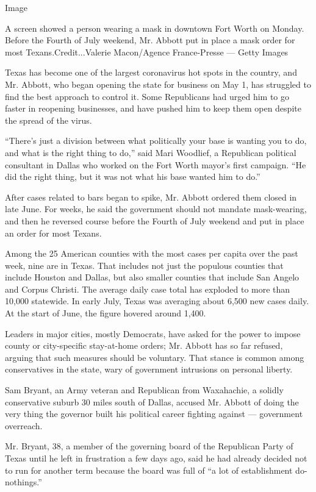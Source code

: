 Image

A screen showed a person wearing a mask in downtown Fort Worth on
Monday. Before the Fourth of July weekend, Mr. Abbott put in place a
mask order for most Texans.Credit...Valerie Macon/Agence France-Presse
--- Getty Images

Texas has become one of the largest coronavirus hot spots in the
country, and Mr. Abbott, who began opening the state for business on May
1, has struggled to find the best approach to control it. Some
Republicans had urged him to go faster in reopening businesses, and have
pushed him to keep them open despite the spread of the virus.

``There's just a division between what politically your base is wanting
you to do, and what is the right thing to do,'' said Mari Woodlief, a
Republican political consultant in Dallas who worked on the Fort Worth
mayor's first campaign. ``He did the right thing, but it was not what
his base wanted him to do.''

After cases related to bars began to spike, Mr. Abbott ordered them
closed in late June. For weeks, he said the government should not
mandate mask-wearing, and then he reversed course before the Fourth of
July weekend and put in place an order for most Texans.

Among the 25 American counties with the most cases per capita over the
past week, nine are in Texas. That includes not just the populous
counties that include Houston and Dallas, but also smaller counties that
include San Angelo and Corpus Christi. The average daily case total has
exploded to more than 10,000 statewide. In early July, Texas was
averaging about 6,500 new cases daily. At the start of June, the figure
hovered around 1,400.

Leaders in major cities, mostly Democrats, have asked for the power to
impose county or city-specific stay-at-home orders; Mr. Abbott has so
far refused, arguing that such measures should be voluntary. That stance
is common among conservatives in the state, wary of government
intrusions on personal liberty.

Sam Bryant, an Army veteran and Republican from Waxahachie, a solidly
conservative suburb 30 miles south of Dallas, accused Mr. Abbott of
doing the very thing the governor built his political career fighting
against --- government overreach.

Mr. Bryant, 38, a member of the governing board of the Republican Party
of Texas until he left in frustration a few days ago, said he had
already decided not to run for another term because the board was full
of ``a lot of establishment do-nothings.''

